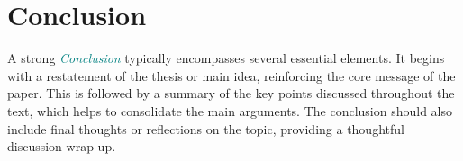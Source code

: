 \section{Conclusion}
\label{sec:conclusion}

A strong \textcolor{teal}{\textit{Conclusion}} typically encompasses several essential elements. It begins with a restatement of the thesis or main idea, reinforcing the core message of the paper. This is followed by a summary of the key points discussed throughout the text, which helps to consolidate the main arguments. The conclusion should also include final thoughts or reflections on the topic, providing a thoughtful discussion wrap-up. \cite{fellows_research_2021}